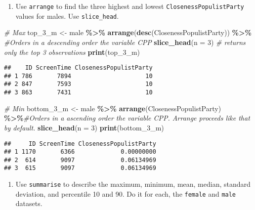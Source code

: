 \documentclass[
]{book}
\newenvironment{Shaded}{\begin{snugshade}}{\end{snugshade}}
\newcommand{\AttributeTok}[1]{\textcolor[rgb]{0.13,0.29,0.53}{#1}}
\newcommand{\CommentTok}[1]{\textcolor[rgb]{0.56,0.35,0.01}{\textit{#1}}}
\newcommand{\DecValTok}[1]{\textcolor[rgb]{0.00,0.00,0.81}{#1}}
\newcommand{\FunctionTok}[1]{\textcolor[rgb]{0.13,0.29,0.53}{\textbf{#1}}}
\newcommand{\NormalTok}[1]{#1}
\newcommand{\OtherTok}[1]{\textcolor[rgb]{0.56,0.35,0.01}{#1}}
\newcommand{\SpecialCharTok}[1]{\textcolor[rgb]{0.81,0.36,0.00}{\textbf{#1}}}
\providecommand{\tightlist}{%
  \setlength{\itemsep}{0pt}\setlength{\parskip}{0pt}}
\begin{document}
\begin{enumerate}
\def\labelenumi{\arabic{enumi}.}
\setcounter{enumi}{10}
\tightlist
\item
  Use \texttt{arrange} to find the three highest and lowest \texttt{ClosenessPopulistParty} values for males. Use \texttt{slice\_head}.
\end{enumerate}

\begin{Shaded}
\begin{Highlighting}[]
\CommentTok{\# Max}
\NormalTok{top\_3\_m }\OtherTok{\textless{}{-}}\NormalTok{ male }\SpecialCharTok{\%\textgreater{}\%}
  \FunctionTok{arrange}\NormalTok{(}\FunctionTok{desc}\NormalTok{(ClosenessPopulistParty)) }\SpecialCharTok{\%\textgreater{}\%} \CommentTok{\#Orders in a descending order the variable CPP}
  \FunctionTok{slice\_head}\NormalTok{(}\AttributeTok{n =} \DecValTok{3}\NormalTok{) }\CommentTok{\# returns only the top 3 observations}
\FunctionTok{print}\NormalTok{(top\_3\_m)}
\end{Highlighting}
\end{Shaded}

\begin{verbatim}
##    ID ScreenTime ClosenessPopulistParty
## 1 786       7894                     10
## 2 847       7593                     10
## 3 863       7431                     10
\end{verbatim}

\begin{Shaded}
\begin{Highlighting}[]
\CommentTok{\# Min  }
\NormalTok{bottom\_3\_m }\OtherTok{\textless{}{-}}\NormalTok{ male }\SpecialCharTok{\%\textgreater{}\%}
  \FunctionTok{arrange}\NormalTok{(ClosenessPopulistParty) }\SpecialCharTok{\%\textgreater{}\%}\CommentTok{\#Orders in a ascending order the variable CPP. \textasciigrave{}Arrange\textasciigrave{} proceeds like that by default.}
  \FunctionTok{slice\_head}\NormalTok{(}\AttributeTok{n =} \DecValTok{3}\NormalTok{)}
\FunctionTok{print}\NormalTok{(bottom\_3\_m)}
\end{Highlighting}
\end{Shaded}

\begin{verbatim}
##     ID ScreenTime ClosenessPopulistParty
## 1 1170       6366             0.00000000
## 2  614       9097             0.06134969
## 3  615       9097             0.06134969
\end{verbatim}

\begin{enumerate}
\def\labelenumi{\arabic{enumi}.}
\setcounter{enumi}{11}
\tightlist
\item
  Use \texttt{summarise} to describe the maximum, minimum, mean, median, standard deviation, and percentile 10 and 90. Do it for each, the \texttt{female} and \texttt{male} datasets.
\end{enumerate}
\end{document}
